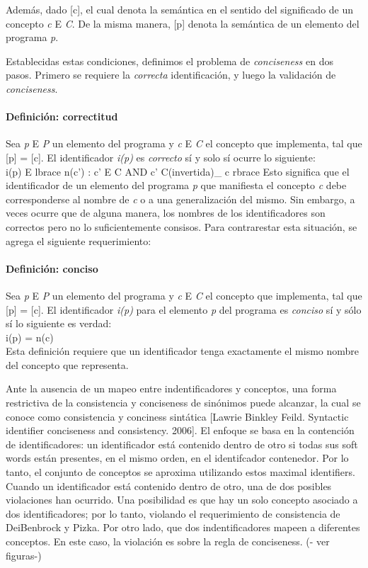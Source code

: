 Además, dado [c], el cual denota la semántica en el sentido del significado de un concepto \textit{c} E \textit{C}. De la misma manera, [p] denota la semántica de un elemento del programa \textit{p}.

Establecidas estas condiciones, definimos el problema de \textit{conciseness} en dos pasos. Primero se requiere la \textit{correcta} identificación, y luego la validación de \textit{conciseness}.

\paragraph{Definición: correctitud}
Sea \textit{p} E \textit{P} un elemento del programa y \textit{c} E \textit{C} el concepto que implementa, tal que [p] = [c]. El identificador \textit{i(p)} es \textit{correcto} sí y solo sí ocurre lo siguiente:
\\i(p) E lbrace n(c') : c' E C AND c' C(invertida)\_ c rbrace
Esto significa que el identificador de un elemento del programa \textit{p} que manifiesta el concepto \textit{c} debe corresponderse al nombre de \textit{c} o a una generalización del mismo. Sin embargo, a veces ocurre que de alguna manera, los nombres de los identificadores son correctos pero no lo suficientemente consisos. Para contrarestar esta situación, se agrega el siguiente requerimiento:

\paragraph{Definición: conciso}
Sea \textit{p} E \textit{P} un elemento del programa y \textit{c} E \textit{C} el concepto que implementa, tal que [p] = [c]. El identificador \textit{i(p)} para el elemento \textit{p} del programa es \textit{conciso} sí y sólo sí lo siguiente es verdad:
\\i(p) = n(c)
\\Esta definición requiere que un identificador tenga exactamente el mismo nombre del concepto que representa.

Ante la ausencia de un mapeo entre indentificadores y conceptos, una forma restrictiva de la consistencia y conciseness de sinónimos puede alcanzar, la cual se conoce como consistencia y conciness sintática [Lawrie Binkley Feild. Syntactic identifier conciseness and consistency. 2006]. 
El enfoque se basa en la contención de identificadores: un identificador está contenido dentro de otro si todas sus soft words están presentes, en el mismo orden, en el identifcador contenedor. 
Por lo tanto, el conjunto de conceptos se aproxima utilizando estos maximal identifiers.
Cuando un identificador está contenido dentro de otro, una de dos posibles violaciones han ocurrido. Una posibilidad es que hay un solo concepto asociado a dos identificadores; por lo tanto, violando el requerimiento de consistencia de DeiBenbrock y Pizka. Por otro lado, que dos indentificadores mapeen a diferentes conceptos. En este caso, la violación es sobre la regla de conciseness. (- ver figuras-)

